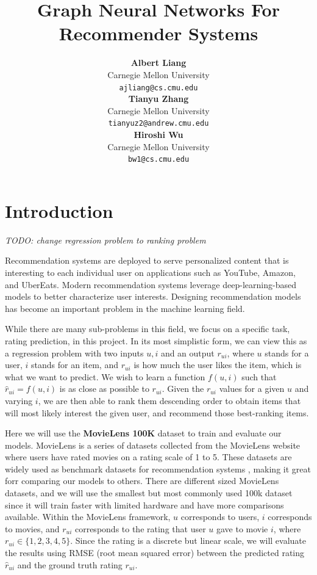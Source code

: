 \documentclass{article}
\title{Graph Neural Networks For Recommender Systems}
\author{
  \textbf{Albert Liang}  \\
  Carnegie Mellon University \\
  \texttt{ajliang@cs.cmu.edu} \\
  \And
  \textbf{Tianyu Zhang} \\
  Carnegie Mellon University \\
  \texttt{tianyuz2@andrew.cmu.edu} \\
  \And
  \textbf{Hiroshi Wu} \\
  Carnegie Mellon University \\
  \texttt{bw1@cs.cmu.edu} \\
}
\begin{document}
\maketitle



\section{Introduction}

\textit{TODO: change regression problem to ranking problem}

Recommendation systems are deployed to serve personalized content that is interesting to each individual user on applications such as YouTube, Amazon, and UberEats. Modern recommendation systems leverage deep-learning-based models to better characterize user interests. Designing recommendation models has become an important problem in the machine learning field.

While there are many sub-problems in this field, we focus on a specific task, rating prediction, in this project. In its most simplistic form, we can view this as a regression problem with two inputs $u,i$ and an output $r_{ui}$, where $u$ stands for a user, $i$ stands for an item, and $r_{ui}$ is how much the user likes the item, which is what we want to predict. We wish to learn a function $f(u,i)$ such that $\hat{r}_{ui}=f(u,i)$ is as close as possible to $r_{ui}$. Given the $r_{ui}$ values for a given $u$ and varying $i$, we are then able to rank them descending order to obtain items that will most likely interest the given user, and recommend those best-ranking items.

Here we will use the \textbf{MovieLens 100K} \cite{movielens} dataset to train and evaluate our models. MovieLens is a series of datasets collected from the MovieLens website where users have rated movies on a rating scale of 1 to 5. These datasets are widely used as benchmark datasets for recommendation systems \cite{DBLP:journals/corr/abs-2011-02260}, making it great forr comparing our models to others. There are different sized MovieLens datasets, and we will use the smallest but most commonly used 100k dataset since it will train faster with limited hardware and have more comparisons available. Within the MovieLens framework, $u$ corresponds to users, $i$ corresponds to movies, and $r_{ui}$ corresponds to the rating that user $u$ gave to movie $i$, where $r_{ui}\in\{1,2,3,4,5\}$. Since the rating is a discrete but linear scale, we will evaluate the results using RMSE (root mean squared error) between the predicted rating $\hat{r}_{ui}$ and the ground truth rating $r_{ui}$.
\end{document}
